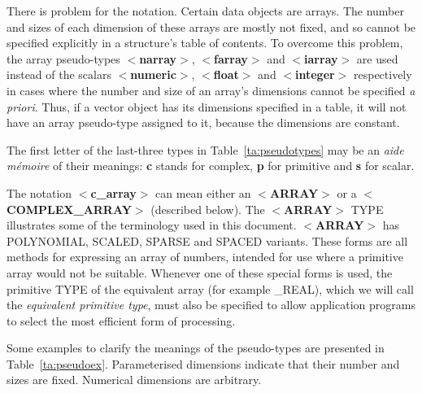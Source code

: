 \documentclass[twoside,11pt]{article}
\begin{document}
There is problem for the notation.
Certain data objects are arrays. The number and sizes of each dimension
of these arrays are mostly not fixed, and so cannot be specified explicitly
in a structure's table of contents.
To overcome this problem, the array pseudo-types
$<${\bf narray}$>$, $<${\bf farray}$>$
and $<${\bf iarray}$>$ are used instead of the scalars
$<${\bf numeric}$>$, $<${\bf float}$>$ and $<${\bf integer}$>$ respectively
in cases where the number and size of an array's dimensions cannot be
specified {\it a priori}.
Thus, if a vector object has its dimensions specified in a table,
it will not have an array pseudo-type assigned to it, because the 
dimensions are constant.

The first letter of the last-three types in Table~\ref{ta:pseudotypes}
may be an {\it aide m\'{e}moire} of their meanings: {\bf c} stands for
complex, {\bf p} for primitive and {\bf s} for scalar.

The notation $<${\bf c\_array}$>$ can mean either an $<${\bf ARRAY}$>$ or a
$<${\bf COMPLEX\_ARRAY}$>$ (described below). The \mbox{$<${\bf ARRAY}$>$} TYPE
illustrates some of the terminology used in this document.
\mbox{$<${\bf ARRAY}$>$} has
POLYNOMIAL, SCALED, SPARSE and SPACED variants.
These forms are all methods for expressing an array of numbers, intended
for use where a primitive array
would not be suitable.  Whenever one of
these special forms is used, the primitive TYPE of the
equivalent array (for example \_REAL), which we will call the
{\it equivalent primitive type}, must also
be specified to allow application programs to select the
most efficient form of processing.

Some examples to clarify the meanings of the pseudo-types are presented
in Table~\ref{ta:pseudoex}.
Parameterised dimensions indicate that their number and sizes are
fixed. Numerical dimensions are arbitrary.
\end{document}
